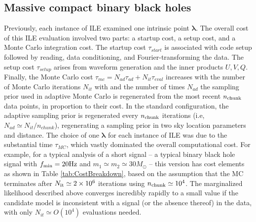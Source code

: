 \documentclass[twocolumn,prd,nofootinbib]{revtex4}
\newcommand\unit[1]{{\rm #1}}
\begin{document}
\subsection{Massive compact binary black holes}
Previously, each instance of ILE examined one intrinsic point $\bm{\lambda}$.  The overall cost of this ILE evaluation
involved two parts: a startup cost, a setup cost, and a Monte Carlo integration cost.  The  startup cost $\tau_{start}$
is associated with code setup followed by reading, data conditioning, and Fourier-transforming the
data.  The setup cost $\tau_{setup}$ arises from waveform generation and  the inner products $U,V,Q$.  Finally, the Monte Carlo
cost $\tau_{mc}=N_{ad} \tau_{ad}+N_{it}\tau_{eval}$ increases with the number of Monte Carlo iterations $N_{it}$ with
and the number of times $N_{ad}$ the sampling prior used in adaptive Monte Carlo is regenerated from the most recent 
$n_{\rm chunk}$ data points, in proportion to their
cost.   In the standard configuration, the adaptive sampling prior is regenerated every $n_{\rm chunk}$ iterations (i.e,
 $N_{ad} \simeq N_{it}/n_{chunk}$), regenerating a sampling prior in two sky location parameters and distance.  
The choice of one $\bm{\lambda}$ for each instance of ILE was due to the substantial time  $\tau_{MC}$, which vastly
dominated the overall computational cost.   For example, for a typical analysis of a short signal --  a typical binary
black hole signal with $f_{\rm min}=20 \unit{Hz}$ and $m_1\simeq m_2\simeq 30 M_\odot$ --  this version has
cost elements as shown in Table \ref{tab:CostBreakdown}, based on the assumption that the MC terminates after $N_{\rm it}\simeq 2\times 10^6$ iterations using
$n_{\rm chunk}\simeq 10^4$.  
The marginalized likelihood described above  converges incredibly rapidly to a small value if the candidate model is
inconsistent with a signal (or the absence thereof) in the data, with only $N_{it} \simeq O(10^4)$  evaluations needed.
\end{document}

